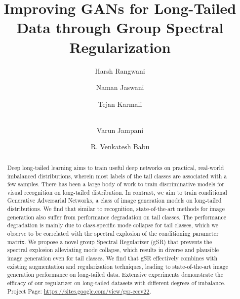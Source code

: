 \documentclass[runningheads,table]{llncs}
\begin{document}
\pagestyle{headings}
\mainmatter
\def\ECCVSubNumber{2334}  

\title{Improving GANs for Long-Tailed Data through Group Spectral Regularization} 




\author{Harsh Rangwani \and
Naman Jaswani \and
Tejan Karmali \and \\
Varun Jampani \and
R. Venkatesh Babu
}

\maketitle

\begin{abstract}
Deep long-tailed learning aims to train useful deep networks on practical, real-world imbalanced distributions, wherein most labels of the tail classes are associated with a few samples. There has been a large body of work to train discriminative models for visual recognition on long-tailed distribution. In contrast, we aim to train conditional Generative Adversarial Networks, a class of image generation models on long-tailed distributions. We find that similar to recognition, state-of-the-art methods for image generation also suffer from performance degradation on tail classes. The performance degradation is mainly due to class-specific mode collapse for tail classes, which we observe to be correlated with the spectral explosion of the conditioning parameter matrix. We propose a novel group Spectral Regularizer (gSR) that prevents the spectral explosion alleviating mode collapse, which results in diverse and plausible image generation even for tail classes. We find that gSR effectively combines with existing augmentation and regularization techniques, leading to state-of-the-art image generation performance on long-tailed data. Extensive experiments demonstrate the efficacy of our regularizer on long-tailed datasets with \mbox{different} degrees of imbalance. Project Page: \href{https://sites.google.com/view/gsr-eccv22}{https://sites.google.com/view/gsr-eccv22}.  

\end{abstract}
\end{document}
